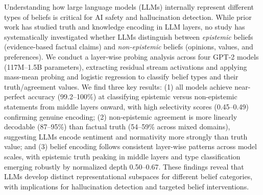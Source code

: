 Understanding how large language models (LLMs) internally represent different types of beliefs is critical for AI safety and hallucination detection.
While prior work has studied truth and knowledge encoding in LLM layers, no study has systematically investigated whether LLMs distinguish between \emph{epistemic} beliefs (evidence-based factual claims) and \emph{non-epistemic} beliefs (opinions, values, and preferences).
We conduct a layer-wise probing analysis across four GPT-2 models (117M--1.5B parameters), extracting residual stream activations and applying mass-mean probing and logistic regression to classify belief types and their truth/agreement values.
We find three key results: (1) all models achieve near-perfect accuracy (99.2--100\%) at classifying epistemic versus non-epistemic statements from middle layers onward, with high selectivity scores (0.45--0.49) confirming genuine encoding; (2) non-epistemic agreement is more linearly decodable (87--95\%) than factual truth (54--59\% across mixed domains), suggesting LLMs encode sentiment and normativity more strongly than truth value; and (3) belief encoding follows consistent layer-wise patterns across model scales, with epistemic truth peaking in middle layers and type classification emerging robustly by normalized depth 0.50--0.67.
These findings reveal that LLMs develop distinct representational subspaces for different belief categories, with implications for hallucination detection and targeted belief interventions.
